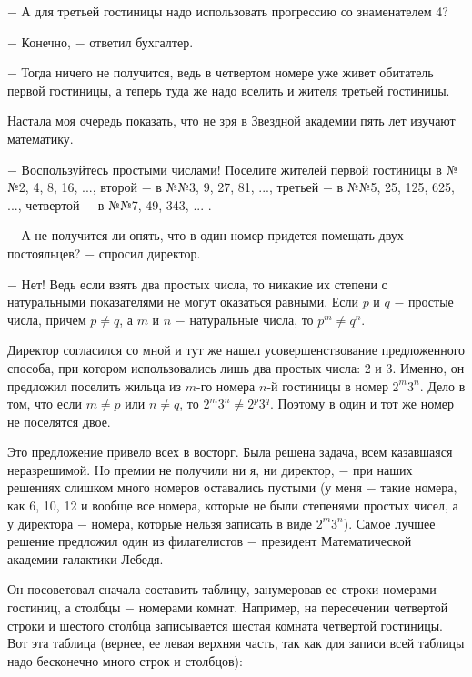 \documentclass{article}
\begin{document}
\(-\) А для третьей гостиницы надо использовать прогрессию со знаменателем 4?

\(-\) Конечно, \(-\) ответил бухгалтер.

\(-\) Тогда ничего не получится, ведь в четвертом номере уже живет обитатель первой гостиницы, а теперь туда же надо вселить и жителя третьей гостиницы.

Настала моя очередь показать, что не зря в Звездной академии пять лет изучают математику.

\(-\) Воспользуйтесь простыми числами! Поселите жителей первой гостиницы в №№2, 4, 8, 16, ..., второй \(-\) в №№3, 9, 27, 81, ..., третьей \(-\) в №№5, 25, 125, 625, ..., четвертой \(-\) в №№7, 49, 343, ... .

\(-\) А не получится ли опять, что в один номер придется помещать двух постояльцев? \(-\) спросил директор.

\(-\) Нет! Ведь если взять два простых числа, то никакие их степени с натуральными показателями не могут оказаться равными. Если \(p\) и \(q\) \(-\) простые числа, причем \(p \neq q\), а \(m\) и \(n\) \(-\) натуральные числа, то \(p^m \neq q^n\).

Директор согласился со мной и тут же нашел усовершенствование предложенного способа, при котором использовались лишь два простых числа: 2 и 3. Именно, он предложил поселить жильца из \(m\)-го номера \(n\)-й гостиницы в номер \(2^m3^n\). Дело в том, что если \(m \neq p\) или \(n \neq q\), то \(2^m3^n \neq 2^p3^q\). Поэтому в один и тот же номер не поселятся двое.

Это предложение привело всех в восторг. Была решена задача, всем казавшаяся неразрешимой. Но премии не получили ни я, ни директор, \(-\) при наших решениях слишком много номеров оставались пустыми (у меня \(-\) такие номера, как 6, 10, 12 и вообще все номера, которые не были степенями простых чисел, а у директора \(-\) номера, которые нельзя записать в виде \(2^m3^n\)). Самое лучшее решение предложил один из филателистов \(-\) президент Математической академии галактики Лебедя.

Он посоветовал сначала составить таблицу, занумеровав ее строки номерами гостиниц, а столбцы \(-\) номерами комнат. Например, на пересечении четвертой строки и шестого столбца записывается шестая комната четвертой гостиницы. Вот эта таблица (вернее, ее левая верхняя часть, так как для записи всей таблицы надо бесконечно много строк и столбцов):
\end{document}
